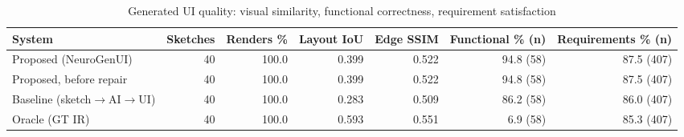 \begin{table}[t]
\centering
\scriptsize
\caption{Generated UI quality: visual similarity, functional correctness, requirement satisfaction}
\label{tab:quality}
\setlength{\tabcolsep}{3.5pt}
\begin{adjustbox}{max width=\textwidth}
\begin{tabular}{lrrrrrr}
\toprule
\textbf{System} & \textbf{Sketches} & \textbf{Renders \%} & \textbf{Layout IoU} & \textbf{Edge SSIM} & \textbf{Functional \% (n)} & \textbf{Requirements \% (n)} \\
\midrule
Proposed (NeuroGenUI) & 40 & 100.0 & 0.399 & 0.522 & 94.8 (58) & 87.5 (407) \\
Proposed, before repair & 40 & 100.0 & 0.399 & 0.522 & 94.8 (58) & 87.5 (407) \\
Baseline (sketch$\rightarrow$AI$\rightarrow$UI) & 40 & 100.0 & 0.283 & 0.509 & 86.2 (58) & 86.0 (407) \\
Oracle (GT IR) & 40 & 100.0 & 0.593 & 0.551 & 6.9 (58) & 85.3 (407) \\
\bottomrule
\end{tabular}
\end{adjustbox}
\end{table}

